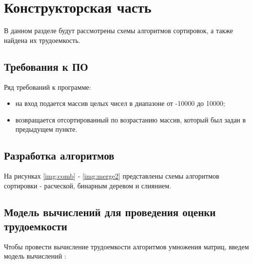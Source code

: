 \chapter{Конструкторская часть}
В данном разделе будут рассмотрены схемы алгоритмов сортировок, а также найдена их трудоемкость.

\section{Требования к ПО}
Ряд требований к программе:
\begin{itemize}
	\item на вход подается массив целых чисел в диапазоне от -10000 до 10000;
    \item возвращается отсортированный по возрастанию массив, который был задан в предыдущем пункте. \newline
\end{itemize}

\section{Разработка алгоритмов}
На рисунках \ref{img:comb} - \ref{img:merge2} представлены схемы алгоритмов сортировки - расческой, бинарным деревом и слиянием.


\clearpage

\section{Модель вычислений для проведения оценки трудоемкости}
Чтобы провести вычисление трудоемкости алгоритмов умножения матриц, введем модель вычислений \cite{model}:


